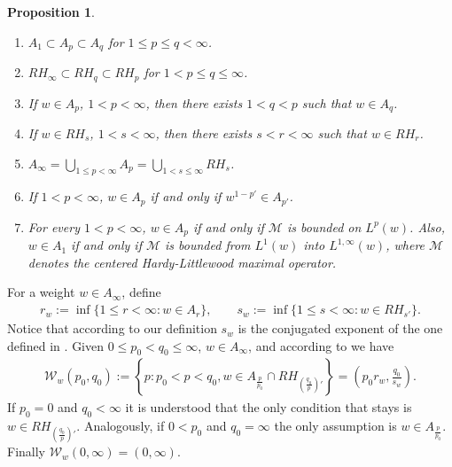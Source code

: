 \documentclass[11pt, a4paper,leqno]{amsart}
\theoremstyle{plain}
\newtheorem{proposition}[equation]{Proposition}
\theoremstyle{definition}
\theoremstyle{remark}
\numberwithin{equation}{section}
\begin{document}
\begin{proposition}\label{prop:weights}\
\begin{enumerate}
\renewcommand{\theenumi}{\roman{enumi}}
\renewcommand{\labelenumi}{$(\theenumi)$}
\addtolength{\itemsep}{0.2cm}

\item $A_1\subset A_p\subset A_q$ for $1\le p\le q<\infty$.

\item $RH_{\infty}\subset RH_q\subset RH_p$ for $1<p\le q\le \infty$.

\item If $w\in A_p$, $1<p<\infty$, then there exists $1<q<p$ such
that $w\in A_q$.

\item If $w\in RH_s$, $1<s<\infty$, then there exists $s<r<\infty$ such
that $w\in RH_r$.

\item $\displaystyle A_\infty=\bigcup_{1\le p<\infty} A_p=\bigcup_{1<s\le
\infty} RH_s$.

\item If $1<p<\infty$, $w\in A_p$ if and only if $w^{1-p'}\in
A_{p'}$.

\item For every $1<p<\infty$, $w\in A_p$ if and only if $\mathcal{M}$ is bounded
on $L^p(w)$. Also, $w\in A_1$ if and only if $\mathcal{M}$ is bounded from $L^1(w)$ into $L^{1,\infty}(w)$, where $\mathcal{M}$ denotes the centered Hardy-Littlewood maximal operator. 


\end{enumerate}
\end{proposition}







\medskip

For a weight $w\in A_{\infty}$, define
\begin{align}\label{rw}
r_w:=\inf\{1\leq r<\infty : w\in A_{r}\},
\qquad
s_w:=\inf\{1\leq s<\infty : w\in RH_{s'}\}.
\end{align}
Notice that according to our definition $s_w$ is the conjugated exponent of the one defined in \cite[Lemma 4.1]{AuscherMartell:I}.
Given $0\le p_0<q_0\le \infty$, $w\in A_{\infty}$, and according to \cite[Lemma 4.1]{AuscherMartell:I} we have
\begin{align}\label{intervalrs}
\mathcal{W}_w(p_0,q_0):=\left\{p : p_0<p<q_0, w\in A_{\frac{p}{p_0}}\cap RH_{\left(\frac{q_0}{p}\right)'}\right\}
=
\left(p_0r_w,\frac{q_0}{s_w}\right).
\end{align}
If $p_0=0$ and $q_0<\infty$ it is understood that the only condition that stays is $w\in RH_{\left(\frac{q_0}{p}\right)'}$. Analogously, if $0<p_0$ and $q_0=\infty$ the only assumption is $w\in A_{\frac{p}{p_0}}$. Finally $\mathcal{W}_w(0,\infty)=(0,\infty)$.
\end{document}
